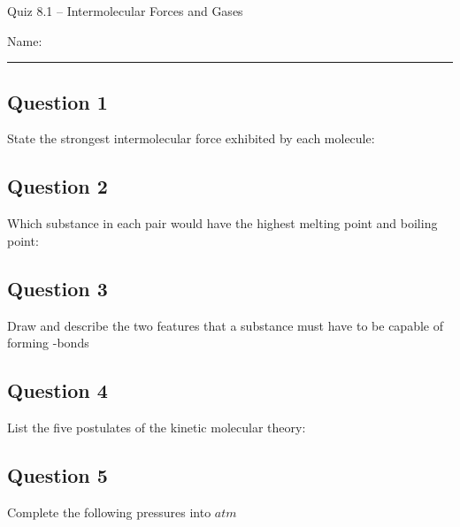 \documentclass[11pt, letterpaper]{memoir}
\begin{document}
	\begin{center}
		{\large Quiz 8.1 --	Intermolecular Forces and Gases}
	\end{center}
	{\large Name: \rule[-1mm]{4in}{.1pt} 

\subsection*{Question 1}
State the strongest intermolecular force exhibited by each molecule:

{\large {} \hspace{3em}  \hspace{3em}  \hspace{3em}  \hspace{3em}  \hspace{3em}  \hspace{3em} }

\vspace{2em}
\subsection*{Question 2}
Which substance in each pair would have the highest melting point and boiling point:

{\large {} \hspace{3em}  \hspace{3em}  \hspace{3em}  \hspace{3em} }

\vspace{2em}
\subsection*{Question 3}
Draw and describe the two features that a substance must have to be capable of forming -bonds

\vspace{4em}
\subsection*{Question 4}
List the five postulates of the kinetic molecular theory:


\vspace{5em}
\subsection*{Question 5}
Complete the following pressures into $atm$

}
\end{document}
